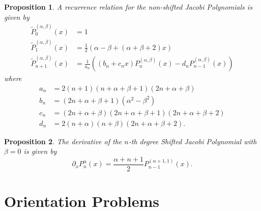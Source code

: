 \documentclass[10pt,a4paper]{article}
\newtheorem{prop}{Proposition}
\begin{document}
    \begin{prop}
        A recurrence relation for the non-shifted Jacobi Polynomials is given by
        \begin{align*}
            \tilde{P}_0^{(\alpha,\beta)}(x) &= 1 \\
            \tilde{P}_1^{(\alpha,\beta)}(x) &= \frac{1}{2} \left( \alpha - \beta + (\alpha+\beta+2)x \right) \\
            \tilde{P}_{n+1}^{(\alpha,\beta)}(x) &= \frac{1}{a_n} \left( (b_n+c_nx)P_n^{(\alpha,\beta)}(x) - d_nP_{n-1}^{(\alpha,\beta)}(x) \right)
        \end{align*}
        where
        \begin{align*}
            a_n &= 2(n+1)(n+\alpha+\beta+1)(2n+\alpha+\beta) \\
            b_n &= (2n+\alpha+\beta+1)(\alpha^2-\beta^2) \\
            c_n &= (2n+\alpha+\beta)(2n+\alpha+\beta+1)(2n+\alpha+\beta+2) \\
            d_n &= 2(n+\alpha)(n+\beta)(2n+\alpha+\beta+2).
        \end{align*}
    \end{prop}

    \begin{prop}
        The derivative of the $n$-th degree Shifted Jacobi Polynomial with $\beta = 0$ is given by
        \begin{equation*}
            \partial_x P_n^{\alpha}(x) = \frac{\alpha+n+1}{2} P_{n-1}^{(\alpha+1,1)}(x).
        \end{equation*}
    \end{prop}


\section{Orientation Problems}
\end{document}
